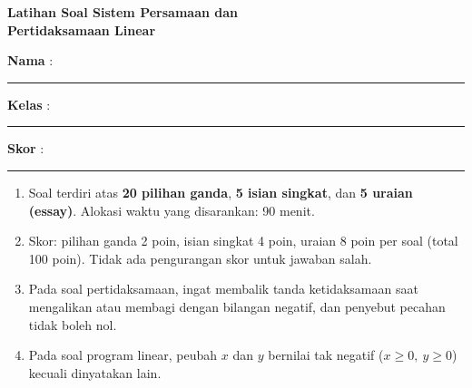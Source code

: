 \documentclass[a4paper,11pt]{article}
\newcounter{no}
\begin{document}
\thispagestyle{fancy}

\begin{center}
  {\color{navy}\fontsize{21}{25}\selectfont\bfseries Latihan Soal Sistem Persamaan dan\\ Pertidaksamaan Linear\par}
\end{center}
\vspace{2pt}
\begin{tcolorbox}[colback=softbg,colframe=navy!40,boxrule=0.6pt,arc=3pt,left=8pt,right=8pt,top=5pt,bottom=5pt]
\noindent\textbf{Nama} : \rule{4.6cm}{0.4pt}\hfill\textbf{Kelas} : \rule{2.2cm}{0.4pt}\hfill\textbf{Skor} : \rule{2.2cm}{0.4pt}
\end{tcolorbox}
\vspace{2pt}
\begin{tcolorbox}[colback=white,colframe=teal,boxrule=0.8pt,arc=3pt,left=8pt,right=8pt,top=4pt,bottom=4pt,title={\bfseries Petunjuk Pengerjaan},coltitle=white,fonttitle=\small]
\small
\begin{enumerate}[leftmargin=1.4em,itemsep=1pt,topsep=1pt]
\item Soal terdiri atas \textbf{20 pilihan ganda}, \textbf{5 isian singkat}, dan \textbf{5 uraian (essay)}. Alokasi waktu yang disarankan: 90 menit.
\item Skor: pilihan ganda 2 poin, isian singkat 4 poin, uraian 8 poin per soal (total 100 poin). Tidak ada pengurangan skor untuk jawaban salah.
\item Pada soal pertidaksamaan, ingat membalik tanda ketidaksamaan saat mengalikan atau membagi dengan bilangan negatif, dan penyebut pecahan tidak boleh nol.
\item Pada soal program linear, peubah $x$ dan $y$ bernilai tak negatif ($x\ge0,\ y\ge0$) kecuali dinyatakan lain.
\end{enumerate}
\end{tcolorbox}
\end{document}
